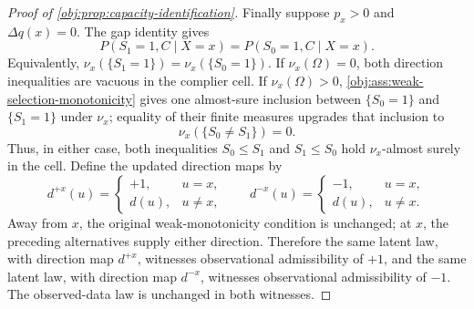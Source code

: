 \documentclass[11pt]{article}
\begin{document}
\begin{proof}[Proof of \cref{obj:prop:capacity-identification}]
Finally suppose \(p_x>0\) and \(\Delta q(x)=0\).  The gap identity gives
\[
P(S_1=1,C\mid X=x)=P(S_0=1,C\mid X=x).
\]
Equivalently, \(\nu_x(\{S_1=1\})=\nu_x(\{S_0=1\})\).  If \(\nu_x(\Omega)=0\), both direction inequalities are vacuous in the complier cell.  If \(\nu_x(\Omega)>0\), \cref{obj:ass:weak-selection-monotonicity} gives one almost-sure inclusion between \(\{S_0=1\}\) and \(\{S_1=1\}\) under \(\nu_x\); equality of their finite measures upgrades that inclusion to
\[
\nu_x(\{S_0\ne S_1\})=0.
\]
Thus, in either case, both inequalities \(S_0\le S_1\) and \(S_1\le S_0\) hold \(\nu_x\)-almost surely in the cell.  Define the updated direction maps by
\[
d^{+x}(u)=
\begin{cases}
+1,&u=x,\\
d(u),&u\ne x,
\end{cases}
\qquad
 d^{-x}(u)=
\begin{cases}
-1,&u=x,\\
d(u),&u\ne x.
\end{cases}
\]
Away from \(x\), the original weak-monotonicity condition is unchanged; at \(x\), the preceding alternatives supply either direction.  Therefore the same latent law, with direction map \(d^{+x}\), witnesses observational admissibility of \(+1\), and the same latent law, with direction map \(d^{-x}\), witnesses observational admissibility of \(-1\).  The observed-data law is unchanged in both witnesses.
\end{proof}
\end{document}
